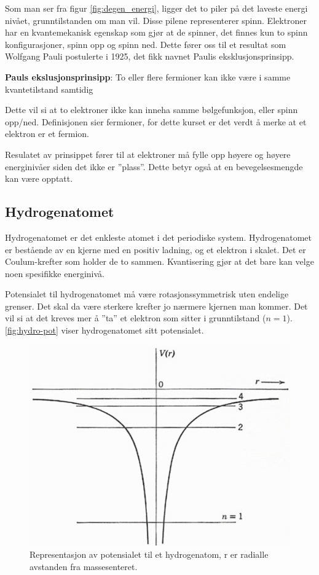 Som man ser fra figur \ref{fig:degen_energi}, ligger det to piler på det laveste energi nivået, grunntilstanden om man vil. Disse pilene representerer spinn. Elektroner har en kvantemekanisk egenskap som gjør at de spinner, det finnes kun to spinn konfigurasjoner, spinn opp og spinn ned. Dette fører oss til et resultat som Wolfgang Pauli postulerte i 1925, det fikk navnet Paulis eksklusjonsprinsipp.

\begin{definition}
    \textbf{Pauls ekslusjonsprinsipp}: To eller flere fermioner kan ikke være i samme kvantetilstand samtidig
\end{definition}

Dette vil si at to elektroner ikke kan inneha samme bølgefunksjon, eller spinn opp/ned. Definisjonen sier fermioner, for dette kurset er det verdt å merke at et elektron er et fermion. 

Resulatet av prinsippet fører til at elektroner må fylle opp høyere og høyere energinivåer siden det ikke er ''plass''. Dette betyr også at en bevegelsesmengde kan være opptatt.

\subsection{Hydrogenatomet}
\label{sec:tema3_3}
Hydrogenatomet er det enkleste atomet i det periodiske system. Hydrogenatomet er bestående av en kjerne med en positiv ladning, og et elektron i skalet. Det er Coulum-krefter som holder de to sammen. Kvantisering gjør at det bare kan velge noen spesifikke energinivå.

Potensialet til hydrogenatomet må være rotasjonssymmetrisk uten endelige grenser. Det skal da være sterkere krefter jo nærmere kjernen man kommer. Det vil si at det kreves mer å ''ta'' et elektron som sitter i grunntilstand ($n=1$). \autoref{fig:hydro-pot} viser hydrogenatomet sitt potensialet.

\begin{figure}[!htb]
    \centering
    \includegraphics[scale=0.8]{Bilder/SamtaleTema3/Hydrogenatomet/hydrogenPot.png}
    \caption{Representasjon av potensialet til et hydrogenatom, r er radialle avstanden fra massesenteret.}
    \label{fig:hydro-pot}
\end{figure}

